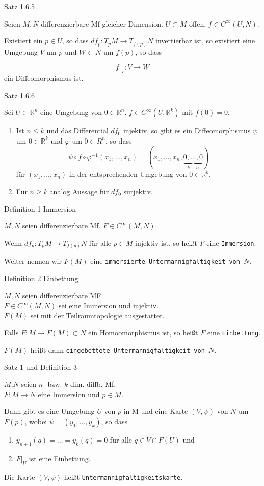 \documentclass[a6paper,11pt,grid=front]{kartei}
\newcommand{\fl}[1]{\begin{flushleft}
 #1 \end{flushleft}}
\newcommand{\R}{\mathbb{R}}
\begin{document}
\nonameyet
{Satz 1.6.5} {}
{
Seien $M,N$ differenzierbare Mf gleicher Dimension. $U \subset M$ offen, 
$f\in C^\infty(U,N)$.
\fl{Existiert ein $p\in U$, so dass $df_p : T_pM \to T_{f(p)}N$ invertierbar
ist,
so existiert eine Umgebung $V$ um $p$ und $W\subset N$ um $f(p)$, so dass }
\[
f|_V : V \to W
\]
ein Diffeomorphismus ist.
}
{}


\nonameyet
{Satz 1.6.6} {}
{
Sei $U\subset \R^n$ eine Umgebung von $0\in \R^n$. $f\in C^\infty(U,\R^k)$ mit
$f(0) = 0 $.
\begin{enumerate}[1.]
\item Ist $n \leq k$ und das Differential $df_0$ injektiv, so gibt es ein
Diffeomorphismus $\psi$ um $0\in \R^k$ und $\varphi$ um $0 \in R^n$, so dass
\[
\psi \circ f \circ \varphi^{-1} (x_1,\dots,x_n) 
= (x_1,\dots,x_n, \underbrace{0,\dots,0}_{k-n})
\]
für $(x_1,\dots,x_n)$ in der entsprechenden Umgebung von $0 \in \R^k$.
\item Für $n \geq k$ analog Aussage für $df_0$ surjektiv.
\end{enumerate}
}
{}


\nonameyet
{Definition 1} {Immersion}
{
$M,N$ seien differenzierbare Mf. $F \in C^\infty(M,N)$. 
\fl{Wenn $df_p: T_pM \to T_{f(p)}N$ für alle $p\in M$ injektiv ist, so 
heißt $F$ eine \texttt{Immersion}.}
\fl{Weiter nennen wir $F(M)$ eine \texttt{immersierte Untermannigfaltigkeit
von $N$}.}
}
{}
\newcommand{\point}{\mathbf{\cdot}}
\nonameyet
{Definition 2} {Einbettung}
{
 $M,N$ seien differenzierbare MF. 
\\
$F \in C^\infty(M,N)$ sei eine Immersion und 
injektiv. 
\\
$F(M)$ sei mit der Teilraumtopologie ausgestattet. 

\fl{Falls $F : M \to F(M) \subset N$ ein Homöomorphismus ist, so heißt 
$F$ eine \texttt{Einbettung}.

\fl{$F(M)$ heißt dann \texttt{eingebettete Untermannigfaltigkeit von $N$}.}
} 
}
{}

\nonameyet
{Satz 1 und Definition 3} {}
{
$M$,$N$ seien $n$- bzw. $k$-dim. diffb. Mf,
\\
$F : M \to N$ eine Immersion und $p \in M$.
\\

\fl{Dann gibt es eine Umgebung $U$ von $p$ in M und eine Karte $(V,\psi)$
von $N$ um $F(p)$, wobei $\psi = (y_1,\dots,y_k)$, so dass

\begin{enumerate}[1.]
\item $y_{n+1}(q) = \dots = y_{k}(q) = 0$ für alle $q \in V \cap F(U)$ und 
\item $F|_U$ ist eine Einbettung.
\end{enumerate}

\fl{Die Karte $(V,\psi)$ heißt \texttt{Untermannigfaltigkeitskarte}.}
}
}
{}
\end{document}
